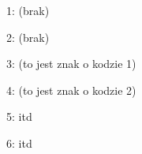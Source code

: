 \documentclass[11pt]{article}
\begin{document}
1: {\ichingfont  {}} (brak)

2: {\ichingfont  {}} (brak)

3: {\ichingfont  {}} (to jest znak o kodzie 1)

4: {\ichingfont  {}} (to jest znak o kodzie 2)

5: {\ichingfont  {}} itd

6: {\ichingfont  {}} itd
\end{document}
